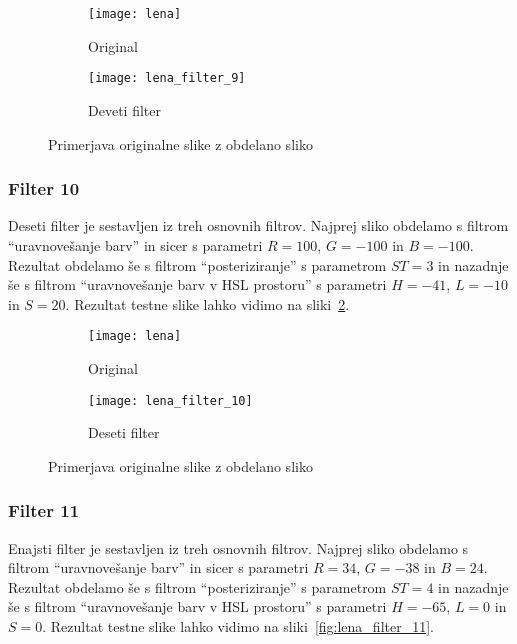 \begin{figure}[!ht]
    \centering
    \begin{subfigure}[b]{0.4\textwidth}
        \texttt{[image: lena]}
        \caption{Original}
    \end{subfigure}
    \begin{subfigure}[b]{0.4\textwidth}
        \texttt{[image: lena\_filter\_9]}
        \caption{Deveti filter}
    \end{subfigure}
    \caption{Primerjava originalne slike z obdelano sliko}
    \label{fig:lena_filter_9}
\end{figure}


\subsubsection*{Filter 10}
Deseti filter je sestavljen iz treh osnovnih filtrov. Najprej sliko obdelamo s
filtrom ``uravnovešanje barv'' in sicer s parametri $R = 100$, $G = -100$ in
$B = -100$. Rezultat obdelamo še s filtrom ``posteriziranje'' s parametrom
$ST= 3$ in nazadnje še s filtrom ``uravnovešanje barv v HSL prostoru'' s
parametri $H = -41$, $L = -10$ in $S = 20$. Rezultat testne slike lahko
vidimo na sliki~\ref{fig:lena_filter_10}.

\begin{figure}[!ht]
    \centering
    \begin{subfigure}[b]{0.4\textwidth}
        \texttt{[image: lena]}
        \caption{Original}
    \end{subfigure}
    \begin{subfigure}[b]{0.4\textwidth}
        \texttt{[image: lena\_filter\_10]}
        \caption{Deseti filter}
    \end{subfigure}
    \caption{Primerjava originalne slike z obdelano sliko}
    \label{fig:lena_filter_10}
\end{figure}


\subsubsection*{Filter 11}
Enajsti filter je sestavljen iz treh osnovnih filtrov. Najprej sliko obdelamo s
filtrom ``uravnovešanje barv'' in sicer s parametri $R = 34$, $G = -38$ in
$B = 24$. Rezultat obdelamo še s filtrom ``posteriziranje'' s parametrom
$ST= 4$ in nazadnje še s filtrom ``uravnovešanje barv v HSL prostoru'' s
parametri $H = -65$, $L = 0$ in $S = 0$. Rezultat testne slike lahko
vidimo na sliki~\ref{fig:lena_filter_11}.


